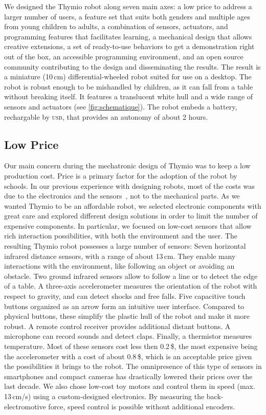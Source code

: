 \documentclass[letterpaper, 10 pt, conference]{ieeeconf}  %
\begin{document}
We designed the Thymio robot along seven main axes: a low price to address a larger number of users, a feature set that suits both genders and multiple ages from young children to adults, a combination of sensors, actuators, and programming features that facilitates learning, a mechanical design that allows creative extensions, a set of ready-to-use behaviors to get a demonstration right out of the box, an accessible programming environment, and an open source  community contributing to the design and disseminating the results.
The result is a miniature (10\,cm) differential-wheeled robot suited for use on a desktop.
The robot is robust enough to be mishandled by children, as it can fall from a table without breaking itself.
It features a translucent white hull and a wide range of sensors and actuators (see \ref{fig:schematique}).
The robot embeds a battery, rechargable by \textsc{usb}, that provides an autonomy of about 2 hours.

\subsection{Low Price}

Our main concern during the mechatronic design of Thymio was to keep a low production cost. 
Price is a primary factor for the adoption of the robot by schools.
In our previous experience with designing robots, most of the costs was due to the electronics and the sensors~\cite{thesis_michael}, not to the mechanical parts.
As we wanted Thymio to be an affordable robot, we selected electronic components with great care and explored different design solutions in order to limit the number of expensive components.
In particular, we focused on low-cost sensors that allow rich interaction possibilities, with both the environment and the user.
The resulting Thymio robot possesses a large number of sensors:
Seven horizontal infrared distance sensors, with a range of about 13\,cm.
They enable many interactions with the environment, like following an object or avoiding an obstacle.
Two ground infrared sensors allow to follow a line or to detect the edge of a table.
A three-axis accelerometer measures the orientation of the robot with respect to gravity, and can detect shocks and free falls.
Five capacitive touch buttons organized as an arrow form an intuitive user interface.
Compared to physical buttons, these simplify the plastic hull of the robot and make it more robust.
A remote control receiver provides additional distant buttons.
A microphone can record sounds and detect claps. 
Finally, a thermistor measures temperature.
Most of these sensors cost less then 0.2\,\$, the most expensive being the accelerometer with a cost of about 0.8\,\$, which is an acceptable price given the possibilities it brings to the robot.
The omnipresence of this type of sensors in smartphones and compact cameras has drastically lowered their prices over the last decade.
We also chose low-cost toy motors and control them in speed (max. 13\,cm/s) using a custom-designed electronics.
By measuring the back-electromotive force, speed control is possible without additional encoders.
\end{document}
